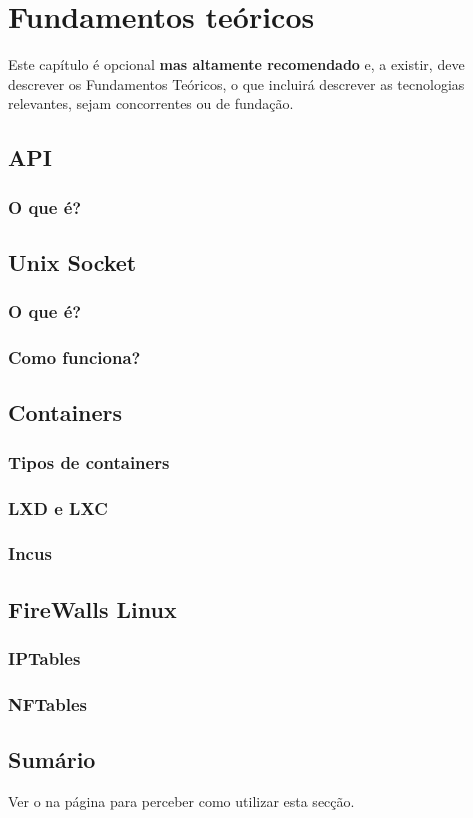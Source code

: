 \chapter{Fundamentos teóricos}
\label{chap:theo}

Este capítulo é opcional \textbf{mas altamente recomendado} e, a existir, deve descrever os Fundamentos Teóricos, o que incluirá descrever as tecnologias relevantes, sejam concorrentes ou de fundação.


\section{API}

\subsection{O que é?}

\section{Unix Socket}

\subsection{O que é?}

\subsection{Como funciona?}


\section{Containers}

\subsection{Tipos de containers}

\subsection{LXD e LXC}

\subsection{Incus}

\section{FireWalls Linux}

\subsection{IPTables}

\subsection{NFTables}

\section*{Sumário}

Ver o  na página \pageref{sec:intro_summary} para perceber como utilizar esta secção.
